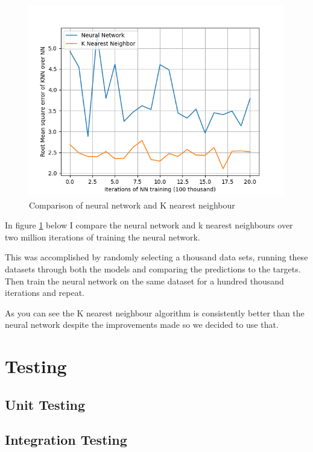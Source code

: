 \documentclass[11pt]{article}
\begin{document}
	\begin{figure}[!htb]
		\begin{center}
			\includegraphics{Resources/PartTwo/Comparison_20220112_152958.png}
			\caption{Comparison of neural network and K nearest neighbour}
			\label{Img:NNKNNComp}
		\end{center}
	\end{figure}
	
	In figure \ref{Img:NNKNNComp} below I compare the neural network and k nearest neighbours over two million iterations of training the neural network.
	
	This was accomplished by randomly selecting a thousand data sets, running these datasets through both the models and comparing the predictions to the targets. Then train the neural network on the same dataset for a hundred thousand iterations and repeat.
	
	As you can see the K nearest neighbour algorithm is consistently better than the neural network despite the improvements made so we decided to use that.	
	
	\section{Testing}
	
	\subsection{Unit Testing}
	
	\subsection{Integration Testing}
	
\end{document}
